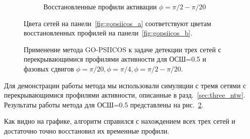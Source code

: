 \begin{figure}[htbp]
\begin{subfigure}[t]{0.4\textwidth}
        \caption{Восстановленные профили активации $\phi=\pi/2-\pi/20$}\label{fig:gopsiicos_f}
    \end{subfigure}
    \caption{Применение метода GO-PSIICOS к задаче детекции трех сетей с перекрывающимися профилями активности для ОСШ=0.5 и фазовых сдвигов $\phi=\pi/20, \phi=\pi/4, \phi=\pi/2-\pi/20$.}\label{fig:gopsiicos}
    Цвета сетей на панели~\ref{fig:gopsiicos_a} соответствуют цветам восстановленных
    профилей на панели~\ref{fig:gopsiicos_b}.
\end{figure}

Для демонстрации работы метода мы использовали симуляции с тремя
сетями с перекрывающимися профилями активности, описанные в разд.~\ref{sec:three_ntw}.
Результаты работы метода для ОСШ=0.5 представлены на рис.~\ref{fig:gopsiicos}.

Как видно на графике, алгоритм справился с нахождением всех трех сетей и достаточно
точно восстановил их временные профили.
